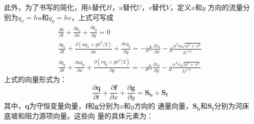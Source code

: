 此外，为了书写的简化，用$h$替代$H$，$u$替代$U$，$v$替代$V$，定义$x$和$y$
方向的流量分别为$q_{x}=hu$和$q_{y}=hv$，上式可写成
\begin{equation}
  \begin{gathered}
    \frac{\partial h}{\partial t} +
    \frac{\partial q_{x}}{\partial x} +
    \frac{\partial q_{y}}{\partial y}
    =
    0
    \\
    \frac{\partial q_{x}}{\partial t} +
    \frac{\partial (uq_{x}+gh^{2}/2)}{\partial x} +
    \frac{\partial vq_{y}}{\partial y}
    =
    -gh\frac{\partial z_{b}}{\partial x}
    -g\frac{n^{2}u\sqrt{u^{2}+v^{2}}}{h^{1/3}}
    \\
    \frac{\partial q_{y}}{\partial t} +
    \frac{\partial uq_{y}}{\partial x} +
    \frac{\partial (vq_{y}+gh^{2}/2)}{\partial y}
    =
    -gh\frac{\partial z_{b}}{\partial y}
    -g\frac{n^{2}v\sqrt{u^{2}+v^{2}}}{h^{1/3}}
  \end{gathered}
\end{equation}
上式的向量形式为：
\begin{equation}
  \frac{\partial \mathbf{q}}{\partial t} +
  \frac{\partial \mathbf{f}}{\partial x} +
  \frac{\partial \mathbf{g}}{\partial y}
  =
  \mathbf{S_{b}} + \mathbf{S_{f}}
\end{equation}
其中，$\mathbf{q}$为守恒变量向量，$\mathbf{f}$和$\mathbf{g}$分别为$x$和$y$方向的
通量向量，$\mathbf{S_{b}}$和$\mathbf{S_{f}}$分别为河床底坡和阻力源项向量。这些向
量的具体元素为：
